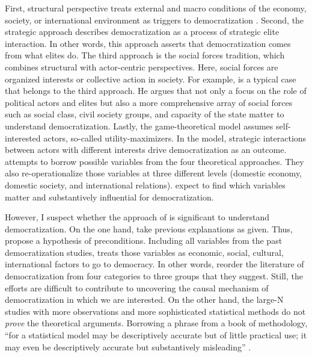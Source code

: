 \documentclass[11pt]{article}
\begin{document}
First, structural perspective treats external and macro conditions of the economy, society, or international environment as triggers to democratization \citep{Pop-Eleches2015}. Second, the strategic approach describes democratization as a process of strategic elite interaction. In other words, this approach asserts that democratization comes from what elites do. The third approach is the social forces tradition, which combines structural with actor-centric perspectives. Here, social forces are organized interests or collective action in society. For example, \citet{Gill2000} is a typical case that belongs to the third approach. He argues that not only a focus on the role of political actors and elites but also a more comprehensive array of social forces such as social class, civil society groups, and capacity of the state matter to understand democratization. Lastly, the game-theoretical model assumes self-interested actors, so-called utility-maximizers. In the model, strategic interactions between actors with different interests drive democratization as an outcome. \citet{Bergschlosser2007ch2} attempts to borrow possible variables from the four theoretical approaches. They also re-operationalize those variables at three different levels (domestic economy, domestic society, and international relations). \citet{Bergschlosser2007ch2} expect to find which variables matter and substantively influential for democratization.

However, I suspect whether the approach of \citet{Bergschlosser2007ch2} is significant to understand democratization. On the one hand, \citet{Bergschlosser2007ch2} take previous explanations as given. Thus, \citet{Bergschlosser2007ch2} propose a hypothesis of preconditions. Including all variables from the past democratization studies, \citet{Bergschlosser2007ch2} treats those variables as economic, social, cultural, international factors to go to democracy. In other words, \citet{Bergschlosser2007ch2} reorder the literature of democratization from four categories to three groups that they suggest. Still, the efforts are difficult to contribute to uncovering the causal mechanism of democratization in which we are interested. On the other hand, the large-N studies with more observations and more sophisticated statistical methods do not \emph{prove} the theoretical arguments. Borrowing a phrase from a book of methodology, ``for a statistical model may be descriptively accurate but of little practical use; it may even be descriptively accurate but substantively misleading'' \citep[4]{Fox2016}.
\end{document}
